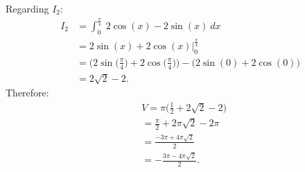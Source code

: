 \documentclass{report}
\begin{document}
    Regarding $I_{2}$:
    \begin{align*}
        I_{2} &= \int_{0}^{\frac{\pi}{4}}\ 2\cos{(x)}-2\sin{(x)}\ dx \\
      &=2\sin{(x)+2\cos{(x)}} \bigg|_0^{\frac{\pi}{4}} \\
      &=\bigg(2\sin{\bigg(\frac{\pi}{4}\bigg)} + 2\cos{\bigg(\frac{\pi}{4}\bigg)}\bigg) - \bigg(2\sin{(0)+2\cos{(0)}}\bigg)\\
      &=2\sqrt{2} -2
    .\end{align*}
    \bigbreak \noindent 
    Therefore:
    \begin{align*}
        &V = \pi \bigg(\frac{1}{2}+2\sqrt{2}-2) \\
        &=\frac{\pi}{2}+2\pi\sqrt{2}-2\pi \\
        &=\frac{-3\pi+4\pi\sqrt{2}}{2} \\
        &=-\frac{3\pi-4\pi\sqrt{2}}{2}
    .\end{align*}
\end{document}
